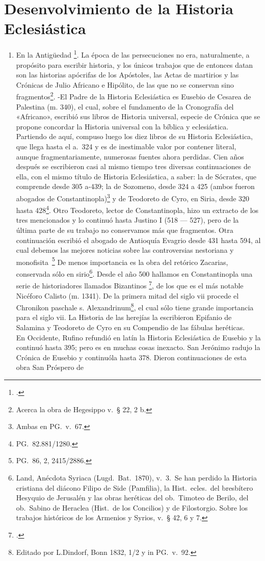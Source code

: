 \raggedbottom{} \documentclass[12pt, a4paper, openany]{book} %
\begin{document}
\section{Desenvolvimiento de la Historia Eclesiástica}
\begin{enumerate}
  \item En la Antigüedad \footcite{Bardenhewer1901Patrologia}. La época de las persecuciones no era, naturalmente, a propósito para escribir historia, y los únicos trabajos que de entonces datan son las historias apócrifas de los Apóstoles, las Actas de martirios y las Crónicas de Julio Africano e Hipólito, de las que no se conservan sino fragmentos\footnote{Acerca la obra de Hegesippo v.\ § 22, 2 b.}. -El Padre de la Historia Eclesiástica es Eusebio de Cesarea de Palestina (m. 340), el cual, sobre el fundamento de la Cronografía del «Africano», escribió sus libros de Historia universal, especie de Crónica que se propone concordar la Historia universal con la bíblica y eclesiástica. Partiendo de aquí, compuso luego los diez libros de su Historia Eclesiástica, que llega hasta el a.\ 324 y es de inestimable valor por contener literal, aunque fragmentariamente, numerosas fuentes ahora perdidas. Cien años después se escribieron casi al mismo tiempo tres diversas continuaciones de ella, con el mismo título de Historia Eclesiástica, a saber: la de Sócrates, que comprende desde 305 a-439; la de Sozomeno, desde 324 a 425 (ambos fueron abogados de Constantinopla)\footnote{Ambas en PG.\ v.\ 67.} y de Teodoreto de Cyro, en Siria, desde 320 hasta 428\footnote{PG.\ 82.881/1280.}. Otro Teodoreto, lector de Constantinopla, hizo un extracto de los tres mencionados y lo continuó hasta Justino I (518 --- 527), pero de la última parte de su trabajo no conservamos más que fragmentos. Otra continuación escribió el abogado de Antioquía Evagrio desde 431 hasta 594, al cual debemos las mejores noticias sobre las controversias nestoriana y monofisita\ \footnote{PG.\ 86, 2, 2415/2886.} De menos importancia es la obra del retórico Zacarias, conservada sólo en sirio\footnote{Land, Anécdota Syriaca (Lugd.\ Bat.\ 1870), v.\ 3.\ Se han perdido la Historia cristiana del diácono Filipo de Side (Pamfilia), la Hist.\ ecles.\ del bresbítero Hesyquio de Jerusalén y las obras heréticas del ob.\ Timoteo de Berilo, del ob.\ Sabino de Heraclea (Hist.\ de los Concilios) y de Filostorgio. Sobre los trabajos históricos de los Armenios y Syrios, v.\ § 42, 6 y 7.}. Desde el año 500 hallamos en Constantinopla una serie de historiadores llamados Bizantinos \footcite{Niebuhr1829Corpus}, de los que es el más notable Nicéforo Calisto (m. 1341). De la primera mitad del siglo vii procede el Chronikon paschale s. Alexandrinum\footnote{Editado por L.\@ Dindorf, Bonn 1832, 1/2 y in PG.\ v.\ 92.}, el cual sólo tiene grande importancia para el siglo vii. La Historia de las herejías la escribieron Epifanio de Salamina y Teodoreto de Cyro en su Compendio de las fábulas heréticas.\\ En Occidente, Rufino refundió en latín la Historia Eclesiástica de Eusebio y la continuó hasta 395; pero es en muchas cosas inexacto. San Jerónimo radujo la Crónica de Eusebio y continuóla hasta 378. Dieron continuaciones de esta obra San Próspero de 
\end{enumerate}
\end{document}

